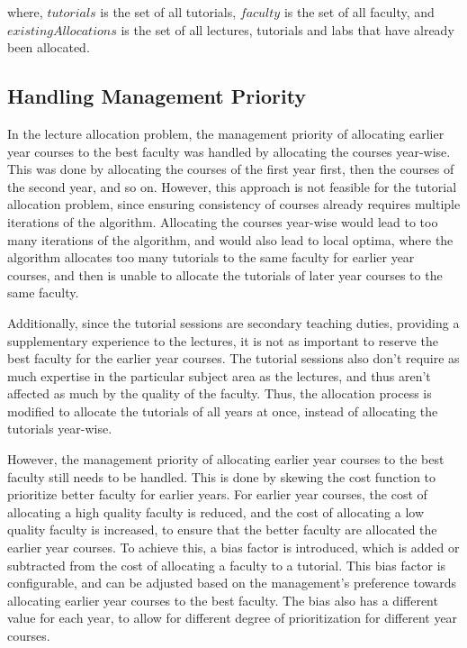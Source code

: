 where, $tutorials$ is the set of all tutorials, $faculty$ is the set of all faculty, and $existingAllocations$ is the set of all lectures, tutorials and labs that have already been allocated.

\subsection{Handling Management Priority}

In the lecture allocation problem, the management priority of allocating earlier year courses to the best faculty was handled by allocating the courses year-wise. This was done by allocating the courses of the first year first, then the courses of the second year, and so on. However, this approach is not feasible for the tutorial allocation problem, since ensuring consistency of courses already requires multiple iterations of the algorithm. Allocating the courses year-wise would lead to too many iterations of the algorithm, and would also lead to local optima, where the algorithm allocates too many tutorials to the same faculty for earlier year courses, and then is unable to allocate the tutorials of later year courses to the same faculty.

Additionally, since the tutorial sessions are secondary teaching duties, providing a supplementary experience to the lectures, it is not as important to reserve the best faculty for the earlier year courses. The tutorial sessions also don't require as much expertise in the particular subject area as the lectures, and thus aren't affected as much by the quality of the faculty. Thus, the allocation process is modified to allocate the tutorials of all years at once, instead of allocating the tutorials year-wise.

However, the management priority of allocating earlier year courses to the best faculty still needs to be handled. This is done by skewing the cost function to prioritize better faculty for earlier years. For earlier year courses, the cost of allocating a high quality faculty is reduced, and the cost of allocating a low quality faculty is increased, to ensure that the better faculty are allocated the earlier year courses. To achieve this, a bias factor is introduced, which is added or subtracted from the cost of allocating a faculty to a tutorial. This bias factor is configurable, and can be adjusted based on the management's preference towards allocating earlier year courses to the best faculty. The bias also has a different value for each year, to allow for different degree of prioritization for different year courses.

